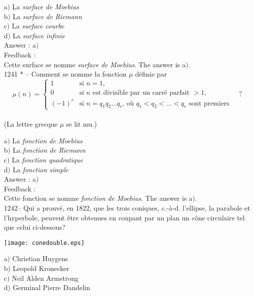 \documentclass[letterpaper, 12pt]{article}
\begin{document}
a$)$ La {\sl surface de Moebius} \\
b$)$ La {\sl surface de Riemann} \\
c$)$ La {\sl surface courbe} \\
d$)$ La {\sl surface infinie}\\

Answer : a$)$\\

Feedback : \\
Cette surface se nomme {\sl surface de Moebius}.
The answer is a$)$.\\

1241 * -- Comment se nomme la fonction $\mu$ d\'efinie par
$$\mu(n)=\begin{cases}
1&\text{si $n=1$,}\\[3mm]
0&\text{si $n$ est divisible par un carr\'e parfait $>1$,}\\[3mm]
(-1)^r&\text{si $n=q_1q_2\ldots q_r$, o\`u $q_1<q_2<\ldots<q_r$ sont
premiers}
\end{cases}\quad?$$\\
(La lettre grecque $\mu$ se lit mu.)

a$)$ La {\sl fonction de Moebius} \\
b$)$ La {\sl fonction de Riemann} \\
c$)$ La {\sl fonction quadratique} \\
d$)$ La {\sl fonction simple}\\

Answer : a$)$\\

Feedback : \\
Cette fonction se nomme {\sl fonction de Moebius}.
The answer is a$)$.\\

1242-- Qui a prouv\'e, en 1822, que les trois coniques, c.-\`a-d.
l'ellipse, la parabole et l'hyperbole, peuvent \^etre obtenues en
coupant par un plan un c\^one circulaire tel que celui ci-dessous?
    \begin{center}
    \texttt{[image: conedouble.eps]}
    \end{center}


a$)$ Christian Huygens \\
b$)$ Leopold Kronecker \\
c$)$ Neil Alden Armstrong \\
d$)$ Germinal Pierre Dandelin\\
\end{document}

